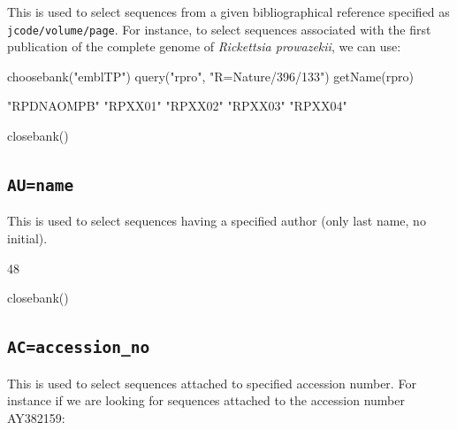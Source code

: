 \documentclass{article}
\begin{document}
This is used to select sequences from a given bibliographical reference specified
as \texttt{jcode/volume/page}. For instance, to select sequences associated
with the first publication \cite{jrl0009} of the complete genome of \textit{Rickettsia prowazekii},
we can use:

\begin{Schunk}
\begin{Sinput}
 choosebank("emblTP")
 query("rpro", "R=Nature/396/133")
 getName(rpro)
\end{Sinput}
\begin{Soutput}
[1] "RPDNAOMPB" "RPXX01"    "RPXX02"    "RPXX03"    "RPXX04"   
\end{Soutput}
\begin{Sinput}
 closebank()
\end{Sinput}
\end{Schunk}

\subsection{\texttt{AU=name}}

This is used to select sequences having a specified author (only last name, no initial).

\begin{Schunk}
\begin{Soutput}
[1] 48
\end{Soutput}
\begin{Sinput}
 closebank()
\end{Sinput}
\end{Schunk}

\subsection{\texttt{AC=accession\_no}}

This is used to select sequences attached to specified accession number.
For instance if we are looking for sequences attached to the accession
number AY382159:
\end{document}
